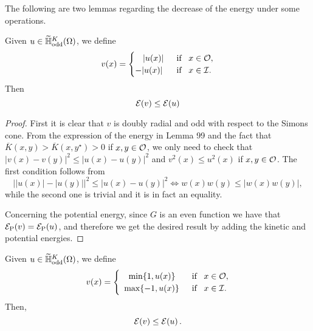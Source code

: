 The following are two lemmas regarding the decrease of the energy under some operations.
\begin{lemma}
\label{Lemma:TruncationOfFunctions1DecreaseEnergy} Given $u\in
\widetilde{\mathbb{H}}^K_{\mathrm{odd}}(\Omega)$, we define
\begin{equation*}
v(x) = \begin{cases}
\hspace{3.2mm}|u(x)| \,\,\, &\text{if } \,\,\, x\in\mathcal{O},\\
-|u(x)| \,\,\, &\text{if } \,\,\, x\in\mathcal{I}.
\end{cases}
\end{equation*}
Then
$$ \mathcal{E}(v) \leq \mathcal{E}(u)  $$
\end{lemma}

\begin{proof}
First it is clear that $v$ is doubly radial and odd with respect to the Simons cone. From the
expression of the energy in Lemma 99 and the fact that $\overline{K}(x,y) > \overline{K}(x,y^\star)
> 0$ if $x,y\in \mathcal{O}$, we only need to check that $|v(x)-v(y)|^2\leq |u(x)-u(y)|^2$ and $v^2(x)
\leq u^2(x)$ if $x,y\in\mathcal{O}$. The first condition follows from
$$ \big||u(x)|-|u(y)|\big|^2\leq |u(x)-u(y)|^2 \Longleftrightarrow w(x)w(y) \leq |w(x)w(y)|,  $$
while the second one is trivial and it is in fact an equality.

Concerning the potential energy, since $G$ is an even function we have that $\mathcal{E}_\mathrm{P}(v) =
\mathcal{E}_\mathrm{P}(u)$, and therefore we get the desired result by adding the kinetic and potential
energies.
\end{proof}

\begin{lemma}
\label{Lemma:TruncationOfFunctions2DecreaseEnergy} Given $u\in
\widetilde{\mathbb{H}}^K_{\mathrm{odd}}(\Omega)$, we define
\begin{equation*}
v(x) = \begin{cases}
\hspace{3.6mm}\min\{1,u(x)\} \,\,\, &\text{if } \,\,\, x\in\mathcal{O},\\
\,\,\,\max\{-1,u(x)\} \,\,\, &\text{if } \,\,\, x\in\mathcal{I}.
\end{cases}
\end{equation*}
Then,
$$ \mathcal{E}(v) \leq \mathcal{E}(u)\,.  $$
\end{lemma}

